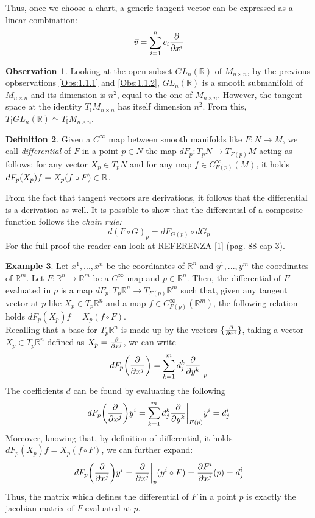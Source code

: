 \documentclass[12pt,a4paper]{report}
\theoremstyle{definition}
\newtheorem{Def}{Definition}[chapter]
\theoremstyle{Theorem}
\theoremstyle{definition}
\newtheorem{Ex}[Def]{Example}
\theoremstyle{definition}
\newtheorem{Obs}[Def]{Observation}
\begin{document}
		Thus, once we choose a chart, a generic tangent vector can be expressed as a linear combination: $$\vec{v}=\sum_{i=1}^{n}c_i{\partial\over \partial x^i}$$ 
		\begin{Obs} \label{Obs 1.1.3}
			Looking at the open subset $GL_n(\mathbb{R})$ of $M_{n\times n}$, by the previous opbservations \ref{Obs:1.1.1} and \ref{Obs:1.1.2}, $GL_n(\mathbb{R})$ is a smooth submanifold of $M_{n\times n}$ and its dimension is $n^2$, equal to the one of $M_{n\times n}$. However, the tangent space at the identity $T_\mathbb{I}M_{n\times n}$ has itself dimension $n^2$. From this, $T_\mathbb{I}GL_n(\mathbb{R})\simeq T_\mathbb{I}M_{n\times n}$.
		\end{Obs}
		\begin{Def}
			Given a $C^\infty$ map between smooth manifolds like $F:N\rightarrow M$, we call \textit{differential} of $F$ in a point $p\in N$ the map $dF_p:T_pN\rightarrow T_{F(p)}M$ acting as follows: for any vector $X_p\in T_pN$ and for any map $f\in C_{F(p)}^\infty(M)$, it holds $dF_p(X_p)f=\\X_p(f\circ F)\in\mathbb{R}$.
		\end{Def}
		From the fact that tangent vectors are derivations, it follows that the differential is a derivation as well. It is possible to show that the differential of a composite function follows the \textit{chain rule:} 
		$$d(F\circ G)_p=dF_{G(p)}\circ dG_p$$ 
		For the full proof the reader can look at REFERENZA [1] (pag. 88 cap 3).
		\begin{Ex}
			Let $x^1,...,x^n$ be the coordiantes of $\mathbb{R}^n$ and $y^1,...,y^m$ the coordinates of $\mathbb{R}^m$. Let $F:\mathbb{R}^n\rightarrow \mathbb{R}^m$ be a $C^\infty$ map and $p\in \mathbb{R}^n$. Then, the differential of $F$ evaluated in $p$ is a map $dF_p:T_p\mathbb{R}^n\rightarrow T_{F(p)}\mathbb{R}^m$ such that, given any tangent vector at $p$ like $X_p\in T_p\mathbb{R}^n$ and a map $f\in C_{F(p)}^\infty(\mathbb{R}^m)$, the following relation holds $dF_p(X_p)f=X_p(f\circ F)$.\\
			Recalling that a base for $T_p\mathbb{R}^n$ is made up by the vectors $\{{\partial\over\partial x^i}\}$, taking a vector $X_p\in T_p\mathbb{R}^n$ defined as $X_p={\partial\over \partial x^j}$, we can write $$dF_p\bigg{(}{\partial\over \partial x^j}\bigg{)}=\sum_{k=1}^{m}d_j^k{\partial\over \partial y^k}\bigg{\rvert}_p$$
			The coefficients $d$ can be found by evaluating the following 
			$$dF_p\bigg{(}{\partial\over \partial x^j}\bigg{)}y^i=\sum_{k=1}^{m}d_j^k{\partial\over \partial y^k}\bigg{\rvert}_{F(p)}y^i=d_j^i$$
			Moreover, knowing that, by definition of differential, it holds $dF_p(X_p)f=X_p(f\circ F)$, we can further expand:
			$$dF_p\bigg{(}{\partial\over \partial x^j}\bigg{)}y^i={\partial\over \partial x^j}\bigg{\rvert}_p(y^i\circ F)={\partial F^i\over \partial x^j}(p)=d^i_j$$
			Thus, the matrix which defines the differential of $F$ in a point $p$ is exactly the jacobian matrix of $F$ evaluated at $p$.
		\end{Ex}
\end{document}
